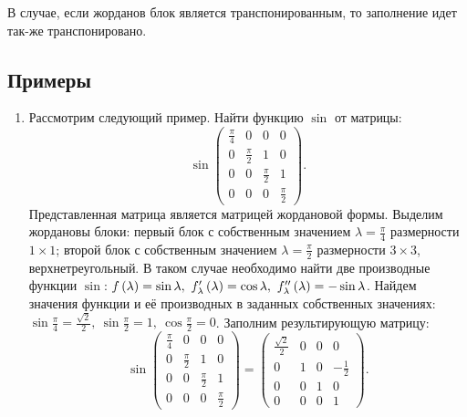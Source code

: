 \begin{enumerate}
		В случае, если жорданов блок является транспонированным, то заполнение идет так-же транспонировано.

	\end{enumerate}

	\subsection{Примеры}

		\begin{enumerate}
			\item Рассмотрим следующий пример. Найти функцию $\sin$ от матрицы:
				\[ \sin\begin{pmatrix} \frac{\pi}{4} & 0 & 0 & 0 \\ 0 & \frac{\pi}{2} & 1 & 0 \\ 0 & 0 & \frac{\pi}{2} & 1 \\ 0 & 0 & 0 & \frac{\pi}{2} \end{pmatrix}. \]
				Представленная матрица является матрицей жордановой формы. Выделим жордановы блоки: первый блок с собственным значением $\lambda = \frac{\pi}{4}$ размерности $1 \times 1$; второй блок с собственным значением $\lambda = \frac{\pi}{2}$ размерности $3 \times 3$, верхнетреугольный. В таком случае необходимо найти две производные функции $\sin$: $f\left( \lambda \right) = \sin{\lambda}, ~ f'_{\lambda} \left( \lambda \right) = \cos{\lambda}, ~ f''_{\lambda} \left( \lambda \right) = - \sin{\lambda}$. Найдем значения функции и её производных в заданных собственных значениях: $\sin{\frac{\pi}{4}} = \frac{\sqrt{2}}{2}, ~ \sin{\frac{\pi}{2}} = 1, ~ \cos{\frac{\pi}{2}} = 0$. Заполним результирующую матрицу:
				\[ \sin\begin{pmatrix} \frac{\pi}{4} & 0 & 0 & 0 \\ 0 & \frac{\pi}{2} & 1 & 0 \\ 0 & 0 & \frac{\pi}{2} & 1 \\ 0 & 0 & 0 & \frac{\pi}{2} \end{pmatrix} = \begin{pmatrix} \frac{\sqrt{2}}{2} & 0 & 0 & 0 \\ 0 & 1 & 0 & -\frac{1}{2} \\ 0 & 0 & 1 & 0 \\ 0 & 0 & 0 & 1 \end{pmatrix}. \]
				

\end{enumerate}
